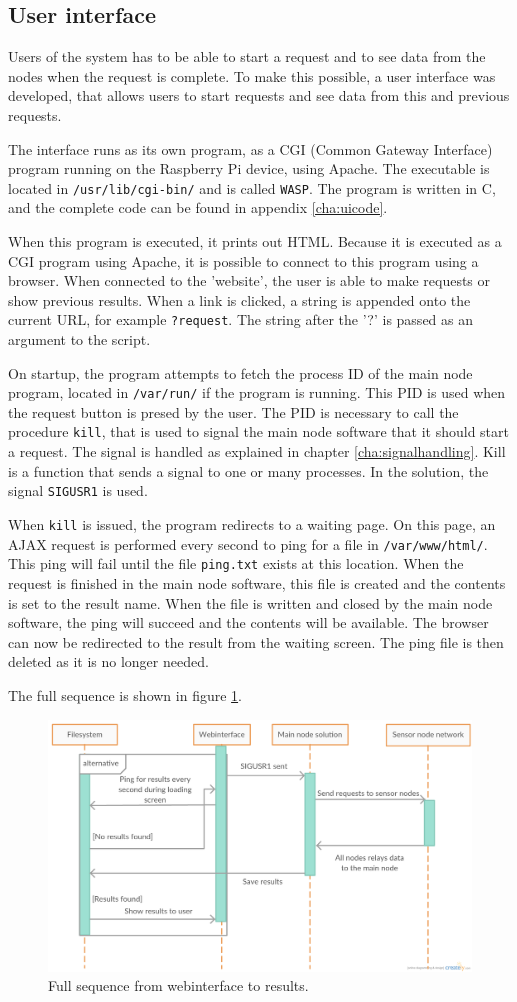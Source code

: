 \subsection{User interface} \label{cha:webinterface}
Users of the system has to be able to start a request and to see data from the nodes when the request is complete. To make this possible, a user interface was developed, that allows users to start requests and see data from this and previous requests.

The interface runs as its own program, as a CGI (Common Gateway Interface) program running on the Raspberry Pi device, using Apache. The executable is located in \texttt{/usr/lib/cgi-bin/} and is called \texttt{WASP}. The program is written in C, and the complete code can be found in appendix \ref{cha:uicode}.

When this program is executed, it prints out HTML. Because it is executed as a CGI program using Apache, it is possible to connect to this program using a browser. When connected to the 'website', the user is able to make requests or show previous results. When a link is clicked, a string is appended onto the current URL, for example \texttt{?request}. The string after the '?' is passed as an argument to the script.

On startup, the program attempts to fetch the process ID of the main node program, located in \texttt{/var/run/} if the program is running. This PID is used when the request button is presed by the user. The PID is necessary to call the procedure \texttt{kill}, that is used to signal the main node software that it should start a request. The signal is handled as explained in chapter \ref{cha:signalhandling}. Kill is a function that sends a signal to one or many processes. In the solution, the signal \texttt{SIGUSR1} is used.

When \texttt{kill} is issued, the program redirects to a waiting page. On this page, an AJAX request is performed every second to ping for a file in \texttt{/var/www/html/}. This ping will fail until the file \texttt{ping.txt} exists at this location. When the request is finished in the main node software, this file is created and the contents is set to the result name. When the file is written and closed by the main node software, the ping will succeed and the contents will be available. The browser can now be redirected to the result from the waiting screen. The ping file is then deleted as it is no longer needed.

The full sequence is shown in figure \ref{fig:sigsequence}.
\begin{figure}[h!]
\centering
\includegraphics[width=1.1\textwidth]{chapters/implementation/figures/sigsequence.png}
\caption{Full sequence from webinterface to results\cite{creately}.}
\label{fig:sigsequence}
\end{figure}